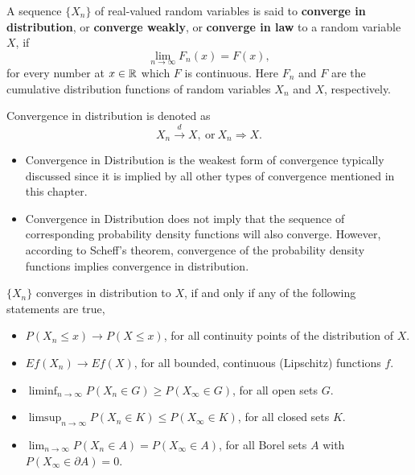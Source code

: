 \begin{definition}\label{def:convergence-in-distribution}
	A sequence \(\{X_n\}\) of real-valued random variables is said to \textbf{converge in distribution}, or \textbf{converge weakly}, or \textbf{converge in law} to a random variable \(X\), if
	\begin{equation}
		\lim_{n\to\infty}F_n(x)=F(x),
	\end{equation}
	for every number at \(x\in\mathbb{R}\) which \(F\) is continuous. Here \(F_n\) and \(F\) are the cumulative distribution functions of random variables \(X_n\) and \(X\), respectively.

	Convergence in distribution is denoted as
	\begin{equation}
		X_n \stackrel{d}{\rightarrow} X, \ \text{or}\  X_n \Rightarrow X.
	\end{equation}
\end{definition}

\begin{itemize}
	\item Convergence in Distribution is the weakest form of convergence typically discussed since it is implied by all other types of convergence mentioned in this chapter.
	\item Convergence in Distribution does not imply that the sequence of corresponding probability density functions will also converge. However, according to Scheff's theorem, convergence of the probability density functions implies convergence in distribution.
\end{itemize}

\begin{theorem}\label{thm:portmanteau-lemma}
	\(\{X_n\}\) converges in distribution to \(X\), if and only if any of the following statements are true,
	\begin{itemize}
		\item \(P(X_n\leq x)\rightarrow P(X\leq x)\), for all continuity points of the distribution of \(X\).
		\item \(Ef(X_n)\rightarrow Ef(X)\), for all bounded, continuous (Lipschitz) functions \(f\).
		\item \(\liminf_{n\rightarrow\infty}P\left(X_{n} \in G\right)\geq P\left(X_{\infty}\in G\right)\), for all open sets \(G\).
		\item \(\limsup_{n \rightarrow\infty}P\left(X_{n} \in K\right) \leq P\left(X_{\infty} \in K\right)\), for all closed sets \(K\).
		\item \(\lim_{n\rightarrow\infty}P\left(X_{n}\in A\right)=P\left(X_{\infty}\in A\right)\), for all Borel sets \(A\) with \(P\left(X_{\infty}\in \partial A\right)=0\).
	\end{itemize}
\end{theorem}

